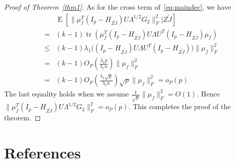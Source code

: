 \documentclass[review]{elsarticle}
\DeclareMathOperator{\mytr}{tr}
\DeclareMathOperator{\myE}{E}
\theoremstyle{plain}
\theoremstyle{definition}
\theoremstyle{remark}
\begin{document}
\begin{proof}[\textrm{Proof of Theorem~\ref{thm1}}]
As for the cross term of~\eqref{eq:maindec}, we have
$$
    \begin{aligned}
        &\myE [\|\mu_f^T (I_p -H_{Z\tilde{J}})U\Lambda^{1/2}G_2\|_F^2|Z\tilde{J}]\\
        = &
        (k-1)\mytr(\mu_f^T (I_p -H_{Z\tilde{J}})U\Lambda U^T (I_p -H_{Z\tilde{J}})\mu_f)\\
        \leq &
        (k-1)\lambda_1\big((I_p -H_{Z\tilde{J}})U\Lambda U^T (I_p -H_{Z\tilde{J}})\big)\|\mu_f\|^2_F\\
        = &
        (k-1) O_P(\frac{\lambda_1 p}{\lambda_r n})  \|\mu_f\|^2_F\\
        = &
        (k-1) O_P(\frac{\lambda_1 \sqrt{p}}{\lambda_r n}) \sqrt{p}  \|\mu_f\|^2_F=o_P(p)
    \end{aligned}
$$
The last equality holds when we assume $\frac{1}{\sqrt{p}}\|\mu_f\|_F^2=O(1)$. Hence $\|\mu_f^T (I_p -H_{Z\tilde{J}})U\Lambda^{1/2}G_2\|_F^2=o_P(p)$.
This completes the proof of the theorem.

\end{proof}






\section*{References}


\end{document}
